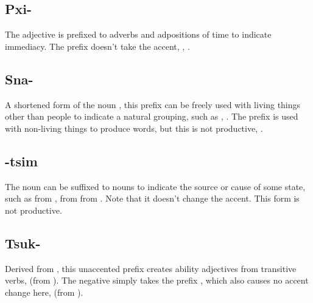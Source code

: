 \subsection{Pxi-} The adjective   is prefixed to
adverbs and adpositions of time to indicate immediacy.  The prefix
doesn't take the accent,  ,
 .

\subsection{Sna-} A shortened form of the noun  , this prefix can be freely used with living
things other than people to indicate a natural grouping, such as
 ,  .  The prefix is used with non-living things to produce words,
but this is not productive,  .

\subsection{-tsim} The noun   can be suffixed to
nouns to indicate the source or cause of some state, such
as  
from  ,   from  
 
from  .  Note that
it doesn't change the accent.  This form is not productive.

\subsection{Tsuk-} Derived from , this unaccented prefix
creates ability adjectives from trans\-it\-ive verbs, 
 (from  ).  The negative simply takes the
prefix , which also causes no accent change here,
  (from  ).

